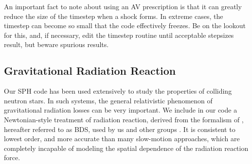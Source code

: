 An important fact to note about using an AV prescription is that it
can greatly reduce the size of the timestep when a shock forms.  In
extreme cases, the timestep can become so small that the code
effectively freezes.  Be on the lookout for this, and, if necessary,
edit the timestep routine until acceptable stepsizes result, but
beware spurious results. 

\subsection{Gravitational Radiation Reaction}
\label{nm:rr}
Our SPH code has been used extensively to study the properties of
colliding neutron stars.  In such systems, the general relativistic
phenomenon of gravitational radiation losses can be very important.
We include in our code a Newtonian-style treatment of radiation
reaction, derived from the formalism of \citet{BDS}, 
hereafter referred to as BDS, used by us \citep{FR1,FR2,FR3} and other groups
\citep{RJS,RJTS,RRJ,APODR}.  
It is consistent to lowest order, and more accurate than
many slow-motion approaches, which are completely incapable of
modeling the spatial dependence of the radiation reaction force.  


